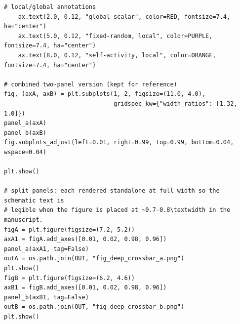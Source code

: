 \begin{lstlisting}[caption={schematics.ipynb code cell 8},label={lst:mrl-nb-schematics-8}]
    # local/global annotations
    ax.text(2.0, 0.12, "global scalar", color=RED, fontsize=7.4, ha="center")
    ax.text(5.0, 0.12, "fixed-random, local", color=PURPLE, fontsize=7.4, ha="center")
    ax.text(8.0, 0.12, "self-activity, local", color=ORANGE, fontsize=7.4, ha="center")

# combined two-panel version (kept for reference)
fig, (axA, axB) = plt.subplots(1, 2, figsize=(11.0, 4.0),
                               gridspec_kw={"width_ratios": [1.32, 1.0]})
panel_a(axA)
panel_b(axB)
fig.subplots_adjust(left=0.01, right=0.99, top=0.99, bottom=0.04, wspace=0.04)

plt.show()

# split panels: each rendered standalone at full width so the schematic text is
# legible when the figure is placed at ~0.7-0.8\textwidth in the manuscript.
figA = plt.figure(figsize=(7.2, 5.2))
axA1 = figA.add_axes([0.01, 0.02, 0.98, 0.96])
panel_a(axA1, tag=False)
outA = os.path.join(OUT, "fig_deep_crossbar_a.png")
plt.show()
figB = plt.figure(figsize=(6.2, 4.6))
axB1 = figB.add_axes([0.01, 0.02, 0.98, 0.96])
panel_b(axB1, tag=False)
outB = os.path.join(OUT, "fig_deep_crossbar_b.png")
plt.show()
\end{lstlisting}

